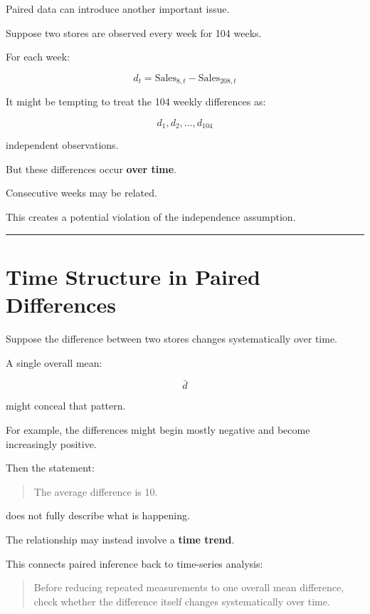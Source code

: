 \documentclass[
  letterpaper,
  DIV=11,
  numbers=noendperiod]{scrreprt}
\begin{document}
Paired data can introduce another important issue.

Suppose two stores are observed every week for 104 weeks.

For each week:

\[
d_t
=
\text{Sales}_{8,t}
-
\text{Sales}_{208,t}
\]

It might be tempting to treat the 104 weekly differences as:

\[
d_1,d_2,\ldots,d_{104}
\]

independent observations.

But these differences occur \textbf{over time}.

Consecutive weeks may be related.

This creates a potential violation of the independence assumption.

\begin{center}\rule{0.5\linewidth}{0.5pt}\end{center}


\chapter{Time Structure in Paired
Differences}\label{time-structure-in-paired-differences}

Suppose the difference between two stores changes systematically over
time.

A single overall mean:

\[
\bar{d}
\]

might conceal that pattern.

For example, the differences might begin mostly negative and become
increasingly positive.

Then the statement:

\begin{quote}
The average difference is 10.
\end{quote}

does not fully describe what is happening.

The relationship may instead involve a \textbf{time trend}.

This connects paired inference back to time-series analysis:

\begin{quote}
Before reducing repeated measurements to one overall mean difference,
check whether the difference itself changes systematically over time.
\end{quote}
\end{document}
